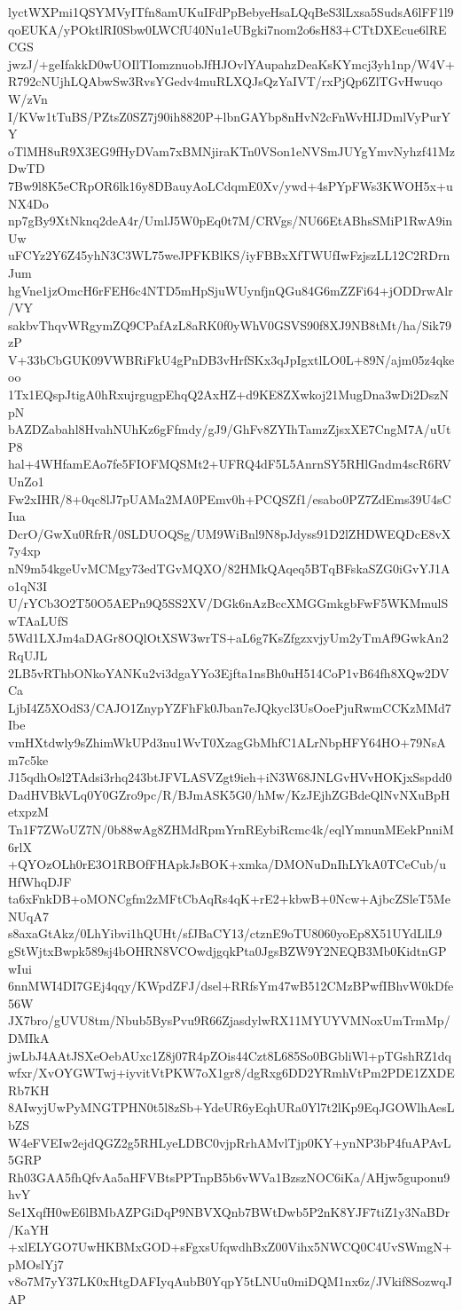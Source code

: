 lyctWXPmi1QSYMVyITfn8amUKuIFdPpBebyeHsaLQqBeS3lLxsa5SudsA6lFF1l9
qoEUKA/yPOktlRI0Sbw0LWCfU40Nu1eUBgki7nom2o6sH83+CTtDXEcue6lRECGS
jwzJ/+geIfakkD0wUOIlTIomznuobJfHJOvlYAupahzDeaKsKYmcj3yh1np/W4V+
R792cNUjhLQAbwSw3RvsYGedv4muRLXQJsQzYaIVT/rxPjQp6ZlTGvHwuqoW/zVn
I/KVw1tTuBS/PZtsZ0SZ7j90ih8820P+lbnGAYbp8nHvN2cFnWvHIJDmlVyPurYY
oTlMH8uR9X3EG9fHyDVam7xBMNjiraKTn0VSon1eNVSmJUYgYmvNyhzf41MzDwTD
7Bw9l8K5eCRpOR6lk16y8DBauyAoLCdqmE0Xv/ywd+4sPYpFWs3KWOH5x+uNX4Do
np7gBy9XtNknq2deA4r/UmlJ5W0pEq0t7M/CRVgs/NU66EtABhsSMiP1RwA9inUw
uFCYz2Y6Z45yhN3C3WL75weJPFKBlKS/iyFBBxXfTWUfIwFzjszLL12C2RDrnJum
hgVne1jzOmcH6rFEH6c4NTD5mHpSjuWUynfjnQGu84G6mZZFi64+jODDrwAlr/VY
sakbvThqvWRgymZQ9CPafAzL8aRK0f0yWhV0GSVS90f8XJ9NB8tMt/ha/Sik79zP
V+33bCbGUK09VWBRiFkU4gPnDB3vHrfSKx3qJpIgxtlLO0L+89N/ajm05z4qkeoo
1Tx1EQspJtigA0hRxujrgugpEhqQ2AxHZ+d9KE8ZXwkoj21MugDna3wDi2DszNpN
bAZDZabahl8HvahNUhKz6gFfmdy/gJ9/GhFv8ZYIhTamzZjsxXE7CngM7A/uUtP8
hal+4WHfamEAo7fe5FIOFMQSMt2+UFRQ4dF5L5AnrnSY5RHlGndm4scR6RVUnZo1
Fw2xIHR/8+0qc8lJ7pUAMa2MA0PEmv0h+PCQSZf1/esabo0PZ7ZdEms39U4sCIua
DcrO/GwXu0RfrR/0SLDUOQSg/UM9WiBnl9N8pJdyss91D2lZHDWEQDcE8vX7y4xp
nN9m54kgeUvMCMgy73edTGvMQXO/82HMkQAqeq5BTqBFskaSZG0iGvYJ1Ao1qN3I
U/rYCb3O2T50O5AEPn9Q5SS2XV/DGk6nAzBccXMGGmkgbFwF5WKMmulSwTAaLUfS
5Wd1LXJm4aDAGr8OQlOtXSW3wrTS+aL6g7KsZfgzxvjyUm2yTmAf9GwkAn2RqUJL
2LB5vRThbONkoYANKu2vi3dgaYYo3Ejfta1nsBh0uH514CoP1vB64fh8XQw2DVCa
LjbI4Z5XOdS3/CAJO1ZnypYZFhFk0Jban7eJQkycl3UsOoePjuRwmCCKzMMd7Ibe
vmHXtdwly9sZhimWkUPd3nu1WvT0XzagGbMhfC1ALrNbpHFY64HO+79NsAm7c5ke
J15qdhOsl2TAdsi3rhq243btJFVLASVZgt9ieh+iN3W68JNLGvHVvHOKjxSspdd0
DadHVBkVLq0Y0GZro9pc/R/BJmASK5G0/hMw/KzJEjhZGBdeQlNvNXuBpHetxpzM
Tn1F7ZWoUZ7N/0b88wAg8ZHMdRpmYrnREybiRcmc4k/eqlYmnunMEekPnniM6rlX
+QYOzOLh0rE3O1RBOfFHApkJsBOK+xmka/DMONuDnIhLYkA0TCeCub/uHfWhqDJF
ta6xFnkDB+oMONCgfm2zMFtCbAqRs4qK+rE2+kbwB+0Ncw+AjbcZSleT5MeNUqA7
s8axaGtAkz/0LhYibvi1hQUHt/sfJBaCY13/ctznE9oTU8060yoEp8X51UYdLlL9
gStWjtxBwpk589sj4bOHRN8VCOwdjgqkPta0JgsBZW9Y2NEQB3Mb0KidtnGPwIui
6nnMWI4DI7GEj4qqy/KWpdZFJ/dsel+RRfsYm47wB512CMzBPwfIBhvW0kDfe56W
JX7bro/gUVU8tm/Nbub5BysPvu9R66ZjasdylwRX11MYUYVMNoxUmTrmMp/DMIkA
jwLbJ4AAtJSXeOebAUxc1Z8j07R4pZOis44Czt8L685So0BGbliWl+pTGshRZ1dq
wfxr/XvOYGWTwj+iyvitVtPKW7oX1gr8/dgRxg6DD2YRmhVtPm2PDE1ZXDERb7KH
8AIwyjUwPyMNGTPHN0t5l8zSb+YdeUR6yEqhURa0Yl7t2lKp9EqJGOWlhAesLbZS
W4eFVEIw2ejdQGZ2g5RHLyeLDBC0vjpRrhAMvlTjp0KY+ynNP3bP4fuAPAvL5GRP
Rh03GAA5fhQfvAa5aHFVBtsPPTnpB5b6vWVa1BzszNOC6iKa/AHjw5guponu9hvY
Se1XqfH0wE6lBMbAZPGiDqP9NBVXQnb7BWtDwb5P2nK8YJF7tiZ1y3NaBDr/KaYH
+xlELYGO7UwHKBMxGOD+sFgxsUfqwdhBxZ00Vihx5NWCQ0C4UvSWmgN+pMOslYj7
v8o7M7yY37LK0xHtgDAFIyqAubB0YqpY5tLNUu0miDQM1nx6z/JVkif8SozwqJAP
